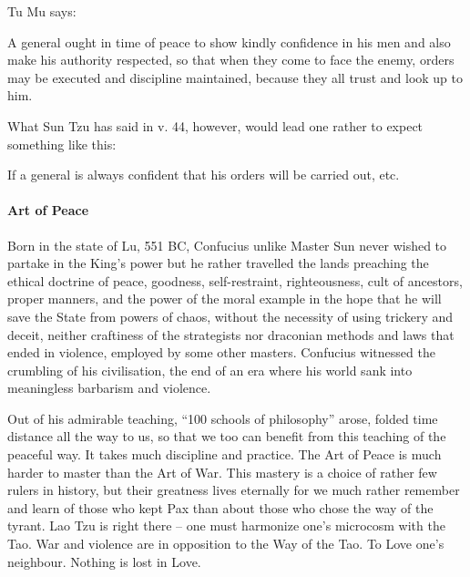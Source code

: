 Tu Mu says:

\begin{quotex}
A general ought in time of peace to show kindly confidence in his men and also make his authority respected, so that when they come to face the enemy, orders may be executed and discipline maintained, because they all trust and look up to him.
\end{quotex}


What Sun Tzu has said in v. 44, however, would lead one rather to expect something like this:

\begin{quotex}
If a general is always confident that his orders will be carried out, etc.
\end{quotex}


\paragraph{Art of Peace}


Born in the state of Lu, 551 BC, Confucius unlike Master Sun never wished to partake in the King's power but he rather travelled the lands preaching the ethical doctrine of peace, goodness, self-restraint, righteousness, cult of ancestors, proper manners, and the power of the moral example in the hope that he will save the State from powers of chaos, without the necessity of using trickery and deceit, neither craftiness of the strategists nor draconian methods and laws that ended in violence, employed by some other masters. Confucius witnessed the crumbling of his civilisation, the end of an era where his world sank into meaningless barbarism and violence.

Out of his admirable teaching, ``100 schools of philosophy'' arose, folded time distance all the way to us, so that we too can benefit from this teaching of the peaceful way. It takes much discipline and practice. The Art of Peace is much harder to master than the Art of War. This mastery is a choice of rather few rulers in history, but their greatness lives eternally for we much rather remember and learn of those who kept Pax than about those who chose the way of the tyrant. Lao Tzu is right there -- one must harmonize one's microcosm with the Tao. War and violence are in opposition to the Way of the Tao. To Love one's neighbour. Nothing is lost in Love.



